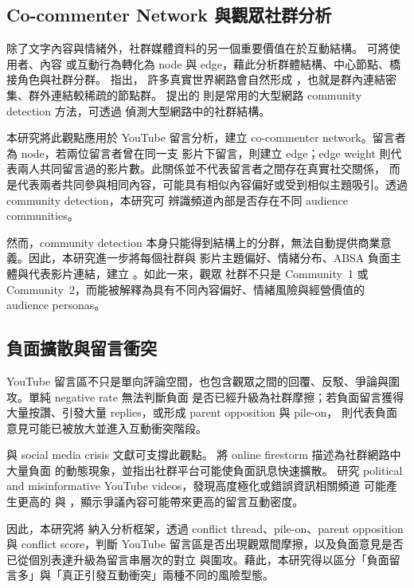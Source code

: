 \subsection{Co-commenter Network 與觀眾社群分析}

除了文字內容與情緒外，社群媒體資料的另一個重要價值在於互動結構。 可將使用者、內容
或互動行為轉化為 node 與 edge，藉此分析群體結構、中心節點、橋接角色與社群分群。\citet{newman2006} 指出，
許多真實世界網路會自然形成 ，也就是群內連結密集、群外連結較稀疏的節點群。
\citet{blondel2008} 提出的  則是常用的大型網路 community detection 方法，可透過
 偵測大型網路中的社群結構。

本研究將此觀點應用於 YouTube 留言分析，建立 co-commenter network。留言者為 node，若兩位留言者曾在同一支
影片下留言，則建立 edge；edge weight 則代表兩人共同留言過的影片數。此關係並不代表留言者之間存在真實社交關係，
而是代表兩者共同參與相同內容，可能具有相似內容偏好或受到相似主題吸引。透過 community detection，本研究可
辨識頻道內部是否存在不同 audience communities。

然而，community detection 本身只能得到結構上的分群，無法自動提供商業意義。因此，本研究進一步將每個社群與
影片主題偏好、情緒分布、ABSA 負面主體與代表影片連結，建立 。如此一來，觀眾
社群不只是 Community~1 或 Community~2，而能被解釋為具有不同內容偏好、情緒風險與經營價值的 audience personas。

\subsection{負面擴散與留言衝突}

YouTube 留言區不只是單向評論空間，也包含觀眾之間的回覆、反駁、爭論與圍攻。單純 negative rate 無法判斷負面
是否已經升級為社群摩擦；若負面留言獲得大量按讚、引發大量 replies，或形成 parent opposition 與 pile-on，
則代表負面意見可能已被放大並進入互動衝突階段。

 與 social media crisis 文獻可支撐此觀點。\citet{pfeffer2014} 將 online
firestorm 描述為社群網路中大量負面  的動態現象，並指出社群平台可能使負面訊息快速擴散。
\citet{heydari2019} 研究 political and misinformative YouTube videos，發現高度極化或錯誤資訊相關頻道
可能產生更高的  與 ，顯示爭議內容可能帶來更高的留言互動密度。

因此，本研究將  納入分析框架，透過 conflict thread、pile-on、parent opposition
與 conflict score，判斷 YouTube 留言區是否出現觀眾間摩擦，以及負面意見是否已從個別表達升級為留言串層次的對立
與圍攻。藉此，本研究得以區分「負面留言多」與「真正引發互動衝突」兩種不同的風險型態。

